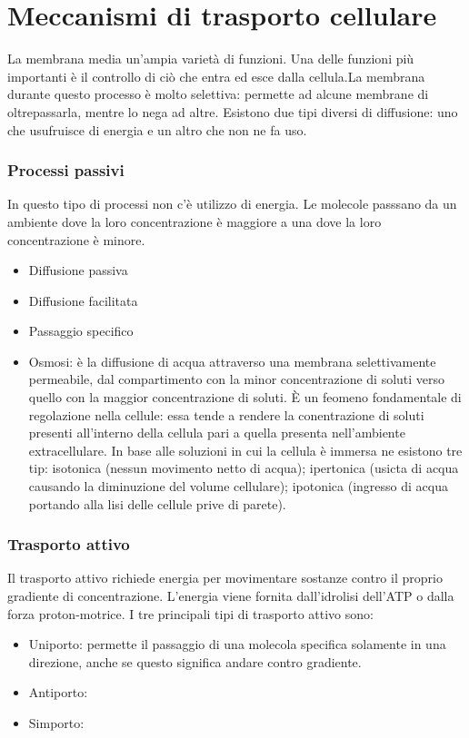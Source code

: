 \chapter{Meccanismi di trasporto cellulare}
La membrana media un'ampia varietà di funzioni. Una delle funzioni pi\`u importanti \`e il controllo di ci\`o  che entra ed esce dalla cellula.La membrana durante questo processo è molto selettiva: permette ad alcune membrane di oltrepassarla, mentre lo nega ad altre. Esistono due tipi diversi di diffusione: uno che usufruisce di energia e un altro che non ne fa uso.
\subsection{Processi passivi}
In questo tipo di processi non c'\`e utilizzo di energia. Le molecole passsano da un ambiente dove la loro concentrazione \`e maggiore a una dove la loro concentrazione \`e minore.
\begin{itemize}
        \item Diffusione passiva
        \item Diffusione facilitata
        \item Passaggio specifico
        \item Osmosi: \`e la diffusione di acqua attraverso una membrana selettivamente permeabile, dal compartimento con la minor concentrazione di soluti verso quello con la maggior concentrazione di soluti. \`E un feomeno fondamentale di regolazione nella cellule: essa tende a rendere la conentrazione di soluti presenti all'interno della cellula pari a quella presenta nell'ambiente extracellulare. In base alle soluzioni in cui la cellula \`e immersa ne esistono tre tip: isotonica (nessun movimento netto di acqua); ipertonica (usicta di acqua causando la diminuzione del volume cellulare); ipotonica (ingresso di acqua portando alla lisi delle cellule prive di parete).
\end {itemize}
\subsection{Trasporto attivo}
Il trasporto attivo richiede energia per movimentare sostanze contro il proprio gradiente di concentrazione. L'energia viene fornita dall'idrolisi dell'ATP o dalla forza proton-motrice.
I tre principali tipi di trasporto attivo sono: 
\begin{itemize}
        \item Uniporto: permette il passaggio di una molecola specifica solamente in una direzione, anche se questo significa andare contro gradiente. 
        \item Antiporto: 
        \item Simporto:
\end{itemize}
